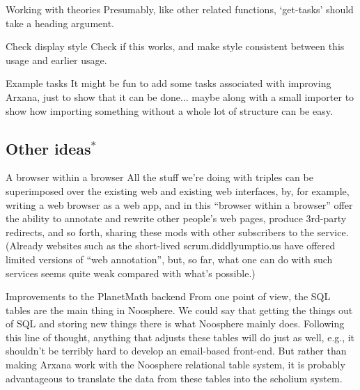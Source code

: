 \begin{notate}{Working with theories}
Presumably, like other related functions, `get-tasks'
should take a heading argument.
\end{notate}

\begin{notate}{Check display style}
Check if this works, and make style consistent between
this usage and earlier usage.
\end{notate}

\begin{notate}{Example tasks}
It might be fun to add some tasks associated with
improving Arxana, just to show that it can be done...
maybe along with a small importer to show how importing
something without a whole lot of structure can be easy.
\end{notate}

\subsection{Other ideas$^*$}

\begin{notate}{A browser within a browser} \label{browser-within}
All the stuff we're doing with triples can be superimposed
over the existing web and existing web interfaces, by, for
example, writing a web browser as a web app, and in this
``browser within a browser'' offer the ability to annotate
and rewrite other people's web pages, produce 3rd-party
redirects, and so forth, sharing these mods with other
subscribers to the service.  (Already websites such as the
short-lived scrum.diddlyumptio.us have offered limited
versions of ``web annotation'', but, so far, what one can
do with such services seems quite weak compared with
what's possible.)
\end{notate}

\begin{notate}{Improvements to the PlanetMath backend}
From one point of view, the SQL tables are the main thing
in Noosphere.  We could say that getting the things out of
SQL and storing new things there is what Noosphere mainly
does.  Following this line of thought, anything that
adjusts these tables will do just as well, e.g., it
shouldn't be terribly hard to develop an email-based
front-end.  But rather than making Arxana work with the
Noosphere relational table system, it is probably
advantageous to translate the data from these tables into
the scholium system.
\end{notate}

